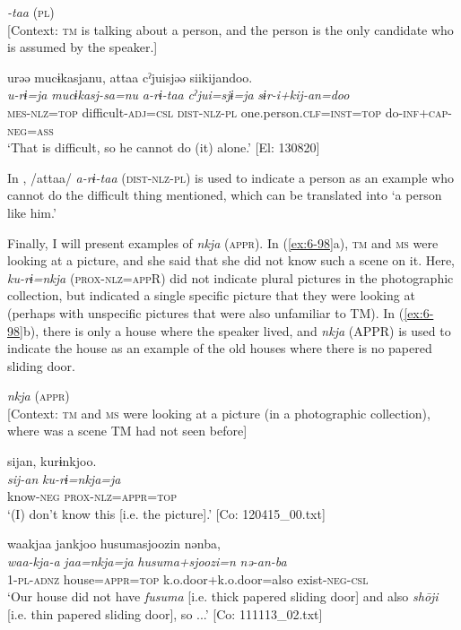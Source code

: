 \ea\label{ex:6-97}
  \textit{-taa} (\textsc{pl})\\{}
  [Context: \textsc{tm} is talking about a person, and the person is the only candidate who is assumed by the speaker.]

{\TM}
\glll urəə  mucɨkasjanu,  attaa cˀjuisjəə  siikijandoo.\\
\textit{u-rɨ=ja}  \textit{mucɨkasj-sa=nu}  \textit{a-rɨ-taa}    \textit{cˀjui=sjɨ=ja}  \textit{sɨr-i+kij-an=doo}\\
    \textsc{mes}-\textsc{nlz}=\textsc{top}  difficult-\textsc{adj}=\textsc{csl}  \textsc{dist}-\textsc{nlz}-\textsc{pl} one.person.\textsc{clf}=\textsc{inst}=\textsc{top}  do-\textsc{inf}+\textsc{cap}-\textsc{neg}=\textsc{ass}\\
\glt    ‘That is difficult, so he cannot do (it) alone.’ [El: 130820]
\z
\z

In , /attaa/ \textit{a-rɨ-taa} (\textsc{dist}-\textsc{nlz}-\textsc{pl}) is used to indicate a person as an example who cannot do the difficult thing mentioned, which can be translated into ‘a person like him.’

  Finally, I will present examples of \textit{nkja} (\textsc{appr}). In (\ref{ex:6-98}a), \textsc{tm} and \textsc{ms} were looking at a picture, and she said that she did not know such a scene on it. Here, \textit{ku-rɨ=nkja} (\textsc{prox}-\textsc{nlz}=\textsc{app}R) did not indicate plural pictures in the photographic collection, but indicated a single specific picture that they were looking at (perhaps with unspecific pictures that were also unfamiliar to TM). In (\ref{ex:6-98}b), there is only a house where the speaker lived, and \textit{nkja} (APPR) is used to indicate the house as an example of the old houses where there is no papered sliding door.

\ea\label{ex:6-98}
  \textit{nkja} (\textsc{appr})\\{}
  [Context: \textsc{tm} and \textsc{ms} were looking at a picture (in a photographic collection), where was a scene TM had not seen before]

 {\TM}
 \ea
\glll  sijan,  kurɨnkjoo.\\
\textit{sij-an}  \textit{ku-rɨ=nkja=ja}\\
know-\textsc{neg}  \textsc{prox}-\textsc{nlz}=\textsc{appr}=\textsc{top}\\
\glt ‘(I) don’t know this [i.e. the picture].’ [Co: 120415\_00.txt]
\z

{\TM}
\ex
\gll waakjaa  jankjoo  {\textbar}husumasjoozi{\textbar}n  nənba,\\
\glll \textit{waa-kja-a}  \textit{jaa=nkja=ja}  \textit{husuma+sjoozi=n}  \textit{nə-an-ba}\\
1-\textsc{pl}-\textsc{adnz}  house=\textsc{appr}=\textsc{top}  k.o.door+k.o.door=also  exist-\textsc{neg}-\textsc{csl}\\
\glt ‘Our house did not have \textit{fusuma} [i.e. thick papered sliding door] and also \textit{shōji} [i.e. thin papered sliding door], so ...’ [Co: 111113\_02.txt]
\z

